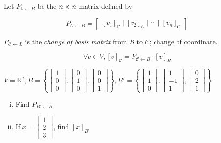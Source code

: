 \begin{definition}
	Let $P_{\mathcal{C} \leftarrow B}$ be the $n\cross n$ matrix defined by

	\begin{equation} \label{eq:change-of-basis}
		P_{\mathcal{C} \leftarrow B} = \begin{bmatrix}
			\left[v_1\right]_{\mathcal{C}} \mid \left[v_2\right]_{\mathcal{C}} \mid \cdots\mid \left[v_n\right]_{\mathcal{C}}
		\end{bmatrix}
	\end{equation}

	$P_{\mathcal{C} \leftarrow B}$ is the \textit{change of basis matrix} from $B$ to $\mathcal{C}$; change of coordinate.
\end{definition}

\begin{theorem}
	\begin{equation} \label{eq:cob-theorem}
		\forall v \in V, [v]_\mathcal{C} = P_{\mathcal{C} \leftarrow B} \cdot [v]_B
	\end{equation}
\end{theorem}

\begin{example}
	$V = \mathbb{R}^n, B = \left\{
		\begin{bmatrix}
			1\\0\\0
		\end{bmatrix}, \begin{bmatrix}
			0\\1\\0
		\end{bmatrix}, \begin{bmatrix}
			0\\0\\1
		\end{bmatrix}\right\}, B' = \left\{
			\begin{bmatrix}
				1\\1\\0
			\end{bmatrix}, \begin{bmatrix}
				1\\-1\\1
			\end{bmatrix}, \begin{bmatrix}
				0\\2\\1
			\end{bmatrix}
		\right\}$

	\begin{enumerate}[i)]
		\item Find $P_{B' \leftarrow B}$
		\item If $x = \begin{bmatrix}
			1\\2\\3
		\end{bmatrix}$, find $[x]_{B'}$
	\end{enumerate}
\end{example}

